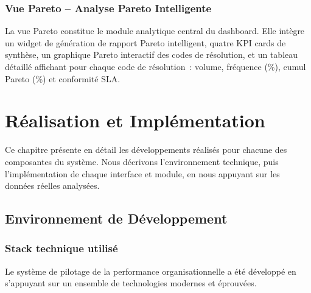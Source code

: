 \documentclass[11pt,a4paper]{report}
\begin{document}
\subsection{Vue Pareto -- Analyse Pareto Intelligente}

La vue Pareto constitue le module analytique central du dashboard. Elle intègre un widget de génération de rapport Pareto intelligent, quatre KPI cards de synthèse, un graphique Pareto interactif des codes de résolution, et un tableau détaillé affichant pour chaque code de résolution~: volume, fréquence (\%), cumul Pareto (\%) et conformité SLA.

\chapter{Réalisation et Implémentation}

Ce chapitre présente en détail les développements réalisés pour chacune des composantes du système. Nous décrivons l'environnement technique, puis l'implémentation de chaque interface et module, en nous appuyant sur les données réelles analysées.

\section{Environnement de Développement}

\subsection{Stack technique utilisé}

Le système de pilotage de la performance organisationnelle a été développé en s'appuyant sur un ensemble de technologies modernes et éprouvées.
\end{document}
